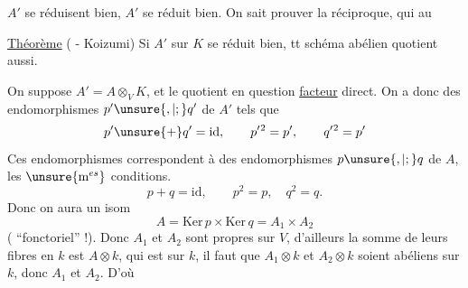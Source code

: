 $A'$ se réduisent bien, $A'$ se réduit bien. On
sait prouver la réciproque, qui 
au

\uline{Théorème} ( - Koizumi) Si $A'$ sur $K$
se réduit bien, tt schéma abélien
quotient aussi.

On  suppose $A'=A\otimes_V K$,
et le quotient en question \uline{facteur} direct.
On a donc des endomorphismes
$p'\unsure{,|;}q'$ de $A'$ tels que
\[
p'\unsure{+}q'=\mathrm{id},\qquad p'{}^2=p',\qquad q'{}^2=p'
\]
Ces endomorphismes correspondent à
des endomorphismes $p\unsure{,|;}q$ de $A$, 
les $\unsure{\mathrm m^{es}}$ conditions.
\[
p+q=\mathrm{id},\qquad p^2=p,\quad q^2=q.
\]
Donc on aura un isom
\[
A=\mathrm{Ker}\,p\times\mathrm{Ker}\,q=A_1\times A_2
\]
( ``fonctoriel'' !). Donc $A_1$ et
$A_2$ sont propres sur $V$, d'ailleurs la
somme de leurs fibres en $k$ est $A\otimes k$,
qui est  sur $k$, il faut que $A_1\otimes k$ et $A_2\otimes k$
soient abéliens sur $k$, donc  $A_1$ et $A_2$. D'où 
